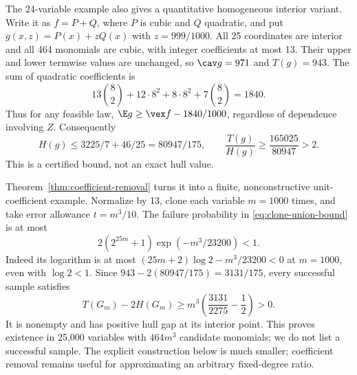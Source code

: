 The 24-variable example also gives a quantitative homogeneous interior
variant. Write it as $f=P+Q$, where $P$ is cubic and $Q$ quadratic,
and put $g(x,z)=P(x)+zQ(x)$ with $z=999/1000$.
All 25 coordinates are interior and all 464 monomials are cubic, with
integer coefficients at most 13. Their upper and lower termwise values
are unchanged, so $\cav g=971$ and $T(g)=943$.
The sum of quadratic coefficients is
\[
 13\binom82+12\cdot8^2+8\cdot8^2+7\binom82=1840.
\]
Thus for any feasible law,
$\E g\ge\vex f-1840/1000$, regardless of dependence involving $Z$.
Consequently
\begin{equation}\label{eq:homogeneous-25}
 H(g)\le3225/7+46/25=80947/175,\qquad
 \frac{T(g)}{H(g)}\ge\frac{165025}{80947}>2.
\end{equation}
This is a certified bound, not an exact hull value.

Theorem~\ref{thm:coefficient-removal} turns it into a finite,
nonconstructive unit-coefficient example. Normalize by 13,
clone each variable $m=1000$ times, and take error allowance $t=m^3/10$.
The failure probability in \eqref{eq:clone-union-bound} is at most
\begin{equation}\label{eq:finite-25000-probability}
 2(2^{25m}+1)\exp(-m^3/23200)<1.
\end{equation}
Indeed its logarithm is at most $(25m+2)\log2-m^3/23200<0$ at $m=1000$,
even with $\log2<1$. Since $943-2(80947/175)=3131/175$, every
successful sample satisfies
\begin{equation}\label{eq:finite-25000-margin}
 T(G_m)-2H(G_m)\ge m^3\left(\frac{3131}{2275}-\frac12\right)>0.
\end{equation}
It is nonempty and has positive hull gap at its interior point. This
proves existence in 25,000 variables with $464m^3$ candidate monomials; we
do not list a successful sample. The explicit construction below is much
smaller; coefficient removal remains useful for approximating an arbitrary
fixed-degree ratio.

